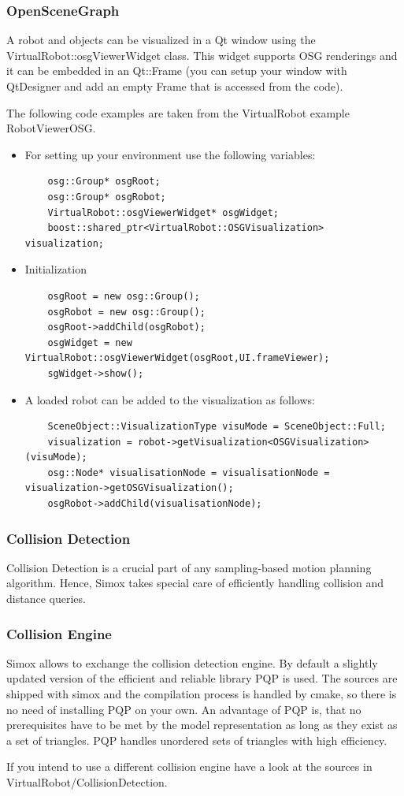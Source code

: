 \subsubsection*{OpenSceneGraph}
A robot and objects can be visualized in a Qt window using the VirtualRobot::osgViewerWidget class. This widget supports OSG renderings and it can be embedded in an Qt::Frame (you can setup your window with QtDesigner and add an empty Frame that is accessed from the code).
\par
The following code examples are taken from the VirtualRobot example RobotViewerOSG. 
\begin{itemize}
\item For setting up your environment use the following variables: 
\begin{lstlisting}
    osg::Group* osgRoot;     
    osg::Group* osgRobot;
    VirtualRobot::osgViewerWidget* osgWidget;
    boost::shared_ptr<VirtualRobot::OSGVisualization> visualization;
\end{lstlisting}
\item Initialization 
\begin{lstlisting}
    osgRoot = new osg::Group();
    osgRobot = new osg::Group();
    osgRoot->addChild(osgRobot);
    osgWidget = new VirtualRobot::osgViewerWidget(osgRoot,UI.frameViewer);
    sgWidget->show();
\end{lstlisting}
\item A loaded robot can be added to the visualization as follows: 
\begin{lstlisting}
    SceneObject::VisualizationType visuMode = SceneObject::Full;
    visualization = robot->getVisualization<OSGVisualization>(visuMode);
    osg::Node* visualisationNode = visualisationNode = visualization->getOSGVisualization();
    osgRobot->addChild(visualisationNode);
\end{lstlisting}
\end{itemize}
\subsubsection{Collision Detection}
Collision Detection is a crucial part of any sampling-based motion planning algorithm. Hence, Simox takes special care of efficiently handling collision and distance queries. 
\par
\subsubsection*{Collision Engine}
\par
Simox allows to exchange the collision detection engine. By default a slightly updated version of the efficient and reliable library PQP is used. The sources are shipped with simox and the compilation process is handled by cmake, so there is no need of installing PQP on your own. An advantage of PQP is, that no prerequisites have to be met by the model representation as long as they exist as a set of triangles. PQP handles unordered sets of triangles with high efficiency.
\par
If you intend to use a different collision engine have a look at the sources in VirtualRobot/CollisionDetection. 
\par

